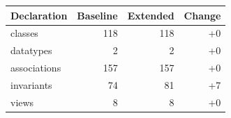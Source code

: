 \begin{tabular}{lrrr}
\toprule
Declaration & Baseline & Extended & Change \\
\midrule
classes & 118 & 118 & +0 \\
datatypes & 2 & 2 & +0 \\
associations & 157 & 157 & +0 \\
invariants & 74 & 81 & +7 \\
views & 8 & 8 & +0 \\
\bottomrule
\end{tabular}
